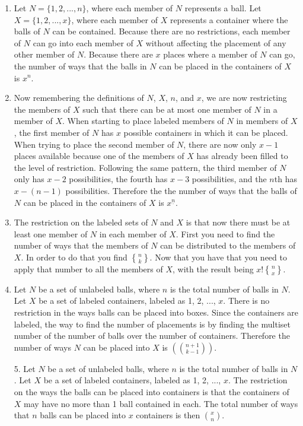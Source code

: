 \documentclass[10pt,a4paper]{report}
\DeclareRobustCommand{\stirling}{\genfrac\{\}{0pt}{}}
\begin{document}
	\begin{enumerate}
		\item Let $N=\{1, 2, ..., n\}$, where each member of $N$ represents a ball.  Let $X=\{1, 2, ..., x\}$, where each member of $X$ represents a container where the balls of $N$ can be contained.  Because there are no restrictions, each member of $N$ can go into each member of $X$ without affecting the placement of any other member of $N$.  Because there are $x$ places where a member of $N$ can go, the number of ways that the balls in $N$ can be placed in the containers of $X$ is $x^{n}$.
		
		\item Now remembering the definitions of $N$, $X$, $n$, and $x$, we are now restricting the members of $X$ such that there can be at most one member of $N$ in a member of $X$.  When starting to place labeled members of $N$ in members of $X$, the first member of $N$ has $x$ possible containers in which it can be placed.  When trying to place the second member of $N$, there are now only $x-1$ places available because one of the members of $X$ has already been filled to the level of restriction.  Following the same pattern, the third member of $N$ only has $x-2$ possibilities, the fourth has $x-3$ possibilities, and the $n$th has $x-(n-1)$ possibilities.  Therefore the the number of ways that the balls of $N$ can be placed in the containers of $X$ is $x^{\underline{n}}$.
		
		\item The restriction on the labeled sets of $N$ and $X$ is that now there must be at least one member of $N$ in each member of $X$.  First you need to find the number of ways that the members of $N$ can be distributed to the members of $X$.  In order to do that you find $\stirling{n}{k}$.  Now that you have that you need to apply that number to all the members of $X$, with the result being $x!\stirling{n}{x}$.
		
		\item Let $N$ be a set of unlabeled balls, where $n$ is the total number of balls in $N$.  Let $X$ be a set of labeled containers, labeled as 1, 2, ..., $x$.  There is no restriction in the ways balls can be placed into boxes.  Since the containers are labeled, the way to find the number of placements is by finding the multiset number of the number of balls over the number of containers.  Therefore the number of ways $N$ can be placed into $X$ is $(\binom{n+1}{k-1})$.
		
		\item[5.] Let $N$ be a set of unlabeled balls, where $n$ is the total number of balls in $N$.  Let $X$ be a set of labeled containers, labeled as 1, 2, ..., $x$.  The restriction on the ways the balls can be placed into containers is that the containers of $X$ may have no more than 1 ball contained in each.  The total number of ways that $n$ balls can be placed into $x$ containers is then $x \choose n$.
		

\end{enumerate}
\end{document}
